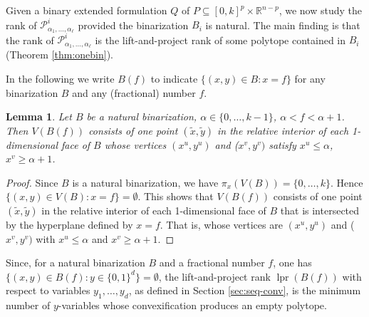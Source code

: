 \documentclass[11pt,a4paper]{article}
\newtheorem{lemma}[theorem]{Lemma}
\newcommand{\R}{\mathbb{R}}
\newcommand{\1}{\textbf{1}}
\newcommand{\lpr}{\operatorname{lpr}}
\begin{document}
 Given  a binary extended formulation $Q$ of  $P\subseteq [0,k]^p\times \R^{n-p}$, we now study the rank of $\mathcal{P}^i_{\alpha_1,\dots,\alpha_{\ell}}$ provided the binarization $B_i$ is natural.
 The main finding is that the rank of $\mathcal{P}^i_{\alpha_1,\dots,\alpha_{\ell}}$ is the lift-and-project rank of some polytope contained in $B_i$ (Theorem \ref{thm:onebin}).
 
 In the following we write $B(f)$ to indicate $\{(x,y)\in B:x=f\}$ for any binarization $B$ and any (fractional) number $f$.


\begin{lemma}\label{le:VBif} Let $B$ be a natural binarization, $\alpha\in \{0,\dots,k-1\}$, $\alpha<f<\alpha+1$. 
Then $V(B(f))$ consists of one point $(\tilde{x},\tilde{y})$ in the relative interior of each 1-dimensional face of $B$ whose vertices $(x^u,y^u)$ and ($x^v,y^v)$ satisfy $x^u\leq \alpha$,  $x^v\geq \alpha+1$.%
\end{lemma}

\begin{proof}
Since $B$ is a natural binarization, we have $\pi_x(V(B))=\{0,\dots,k\}$. Hence $\{(x,y)\in V(B):x=f\}=\emptyset$.  This shows that   $V(B(f))$ consists of one point $(\tilde{x},\tilde{y})$ in the relative interior of each 1-dimensional face of $B$ that is intersected by the hyperplane defined by $x=f$. That is, whose vertices are $(x^u,y^u)$ and ($x^v,y^v)$ with $x^u\leq \alpha$ and $x^v\geq \alpha+1$.
\end{proof}

Since, for a natural binarization $B$ and a  fractional number $f$, one has $\{(x,y)\in B(f):y\in \{0,1\}^d\}=\emptyset$, the lift-and-project rank  $\lpr(B(f))$ with respect to variables $y_1,\dots,y_d$, 
as defined in Section \ref{sec:seq-conv}, is the minimum number of $y$-variables whose convexification produces an empty polytope.
\end{document}
